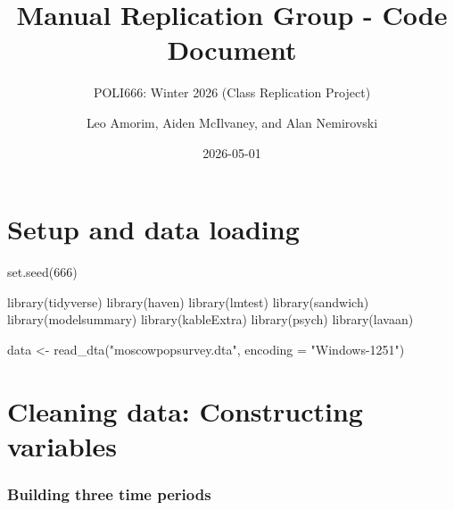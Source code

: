 \documentclass[
  letterpaper,
  DIV=11,
  numbers=noendperiod]{scrartcl}
\title{Manual Replication Group - Code Document}
\subtitle{POLI666: Winter 2026 (Class Replication Project)}
\author{Leo Amorim, Aiden McIlvaney, and Alan Nemirovski}
\date{2026-05-01}
\newenvironment{Shaded}{\begin{snugshade}}{\end{snugshade}}
\newcommand{\AttributeTok}[1]{\textcolor[rgb]{0.40,0.45,0.13}{#1}}
\newcommand{\ConstantTok}[1]{\textcolor[rgb]{0.56,0.35,0.01}{#1}}
\newcommand{\DecValTok}[1]{\textcolor[rgb]{0.68,0.00,0.00}{#1}}
\newcommand{\FunctionTok}[1]{\textcolor[rgb]{0.28,0.35,0.67}{#1}}
\newcommand{\NormalTok}[1]{\textcolor[rgb]{0.00,0.23,0.31}{#1}}
\newcommand{\OtherTok}[1]{\textcolor[rgb]{0.00,0.23,0.31}{#1}}
\newcommand{\SpecialCharTok}[1]{\textcolor[rgb]{0.37,0.37,0.37}{#1}}
\newcommand{\StringTok}[1]{\textcolor[rgb]{0.13,0.47,0.30}{#1}}
\begin{document}
\maketitle


\section{Setup and data loading}\label{setup-and-data-loading}

\begin{Shaded}
\end{Shaded}

\begin{Shaded}
\begin{Highlighting}[]
\FunctionTok{set.seed}\NormalTok{(}\DecValTok{666}\NormalTok{)}

\FunctionTok{library}\NormalTok{(tidyverse)}
\FunctionTok{library}\NormalTok{(haven)}
\FunctionTok{library}\NormalTok{(lmtest)}
\FunctionTok{library}\NormalTok{(sandwich)}
\FunctionTok{library}\NormalTok{(modelsummary)}
\FunctionTok{library}\NormalTok{(kableExtra)}
\FunctionTok{library}\NormalTok{(psych)}
\FunctionTok{library}\NormalTok{(lavaan)}

\NormalTok{data }\OtherTok{\textless{}{-}} \FunctionTok{read\_dta}\NormalTok{(}\StringTok{"moscowpopsurvey.dta"}\NormalTok{, }\AttributeTok{encoding =} \StringTok{"Windows{-}1251"}\NormalTok{)}
\end{Highlighting}
\end{Shaded}

\section{Cleaning data: Constructing
variables}\label{cleaning-data-constructing-variables}

\subsubsection{Building three time
periods}\label{building-three-time-periods}
\end{document}
